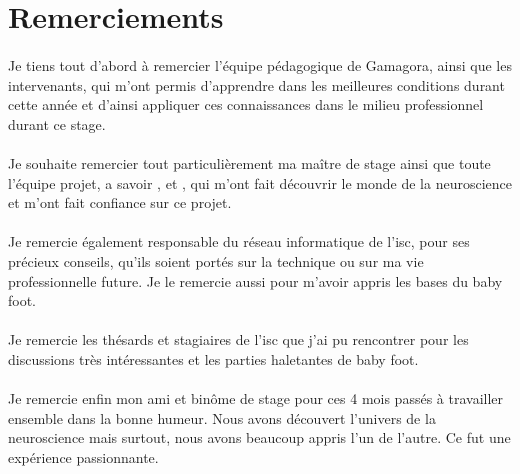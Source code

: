 \section*{Remerciements}

\paragraph{}Je tiens tout d'abord à remercier l'équipe pédagogique de Gamagora, ainsi que les intervenants, qui m’ont permis d’apprendre dans les meilleures conditions durant cette
année et d’ainsi appliquer ces connaissances dans le milieu professionnel durant ce stage.

\paragraph{}Je souhaite remercier tout particulièrement ma maître de stage  ainsi que toute l'équipe projet, a savoir , 
et , qui m'ont fait découvrir le monde de la neuroscience et m'ont fait confiance sur ce projet.

\paragraph{}Je remercie également  responsable du réseau informatique de l'\gls{isc}, pour ses précieux conseils, qu'ils soient portés sur la technique ou sur ma vie
professionnelle future. Je le remercie aussi pour m'avoir appris les bases du baby foot.

\paragraph{}Je remercie les thésards et stagiaires de l'\gls{isc} que j'ai pu rencontrer pour les discussions très intéressantes et les parties haletantes de baby foot.

\paragraph{}Je remercie enfin mon ami et binôme de stage  pour ces 4 mois passés à travailler ensemble dans la bonne humeur. Nous avons découvert l'univers de
la neuroscience mais surtout, nous avons beaucoup appris l'un de l'autre. Ce fut une expérience passionnante.

\newpage